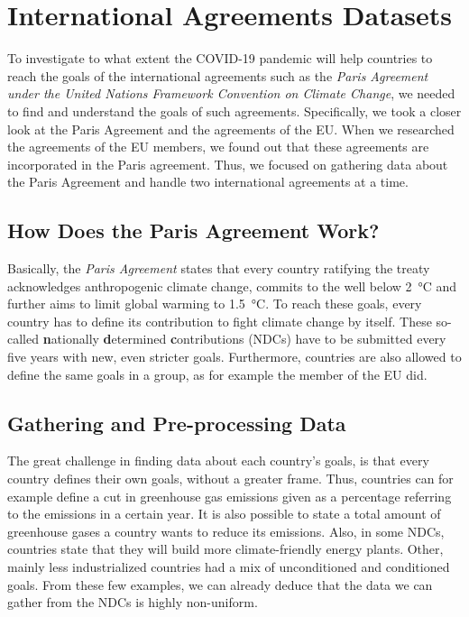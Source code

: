 \section{International Agreements Datasets}

To investigate to what extent the COVID-19 pandemic will help countries to reach the goals of the international agreements such as the \textit{Paris Agreement under the United Nations Framework Convention on Climate Change}, we needed to find and understand the goals of such agreements. Specifically, we took a closer look at the Paris Agreement and the agreements of the EU. When we researched the agreements of the EU members, we found out that these agreements are incorporated in the Paris agreement. Thus, we focused on gathering data about the Paris Agreement and handle two international agreements at a time.

\subsection{How Does the Paris Agreement Work?}

Basically, the \textit{Paris Agreement} states that every country  ratifying the treaty acknowledges anthropogenic climate change, commits to the well below \SI{2}{\degreeCelsius} and further aims to limit global warming to \SI{1.5}{\degreeCelsius}. To reach these goals, every country has to define its contribution to fight climate change by itself. These so-called \textbf{n}ationally \textbf{d}etermined \textbf{c}ontributions (NDCs) have to be submitted every five years with new, even stricter goals. Furthermore, countries are also allowed to define the same goals in a group, as for example the member of the EU did.

\subsection{Gathering and Pre-processing Data}

The great challenge in finding data about each country's goals, is that every country defines their own goals, without a greater frame. Thus, countries can for example define a cut in greenhouse gas emissions given as a percentage referring to the emissions in a certain year. It is also possible to state a total amount of greenhouse gases a country wants to reduce its emissions. Also, in some NDCs, countries state that they will build more climate-friendly energy plants. Other, mainly less industrialized countries had a mix of unconditioned and conditioned goals. From these few examples, we can already deduce that the data we can gather from the NDCs is highly non-uniform.

